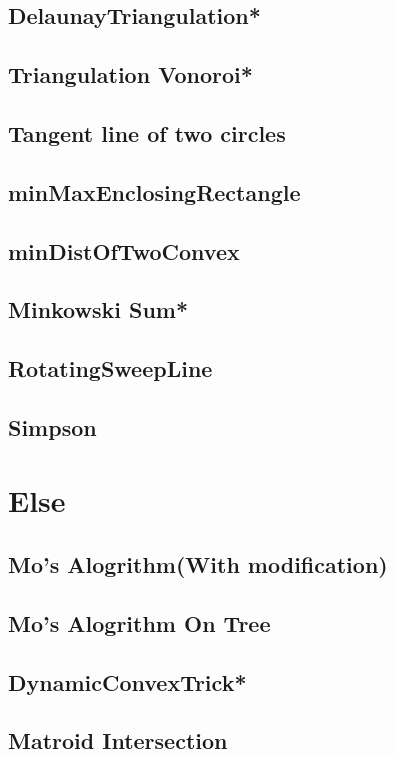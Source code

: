 \subsection{DelaunayTriangulation*} %

\subsection{Triangulation Vonoroi*} %

\subsection{Tangent line of two circles}

\subsection{minMaxEnclosingRectangle}

\subsection{minDistOfTwoConvex}

\subsection{Minkowski Sum*} %

\subsection{RotatingSweepLine}

\subsection{Simpson}


\section{Else}
\subsection{Mo's Alogrithm(With modification)}

\subsection{Mo's Alogrithm On Tree}

\subsection{DynamicConvexTrick*} %

%
\subsection{Matroid Intersection}

